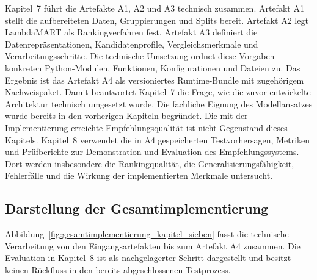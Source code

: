 \label{subsec:zusammenhang_zusammenfassung_implementierung} Kapitel~7 führt die Artefakte A1, A2 und A3 technisch zusammen. Artefakt A1 stellt die aufbereiteten Daten, Gruppierungen und Splits bereit. Artefakt A2 legt LambdaMART als Rankingverfahren fest. Artefakt A3 definiert die Datenrepräsentationen, Kandidatenprofile, Vergleichsmerkmale und Verarbeitungsschritte. Die technische Umsetzung ordnet diese Vorgaben konkreten Python-Modulen, Funktionen, Konfigurationen und Dateien zu. Das Ergebnis ist das Artefakt A4 als versioniertes Runtime-Bundle mit zugehörigem Nachweispaket. Damit beantwortet Kapitel~7 die Frage, wie die zuvor entwickelte Architektur technisch umgesetzt wurde. Die fachliche Eignung des Modellansatzes wurde bereits in den vorherigen Kapiteln begründet. Die mit der Implementierung erreichte Empfehlungsqualität ist nicht Gegenstand dieses Kapitels. Kapitel~8 verwendet die in A4 gespeicherten Testvorhersagen, Metriken und Prüfberichte zur Demonstration und Evaluation des Empfehlungssystems. Dort werden insbesondere die Rankingqualität, die Generalisierungsfähigkeit, Fehlerfälle und die Wirkung der implementierten Merkmale untersucht. \subsection{Darstellung der Gesamtimplementierung} \label{subsec:darstellung_gesamtimplementierung} Abbildung~\ref{fig:gesamtimplementierung_kapitel_sieben} fasst die technische Verarbeitung von den Eingangsartefakten bis zum Artefakt A4 zusammen. Die Evaluation in Kapitel~8 ist als nachgelagerter Schritt dargestellt und besitzt keinen Rückfluss in den bereits abgeschlossenen Testprozess. 
